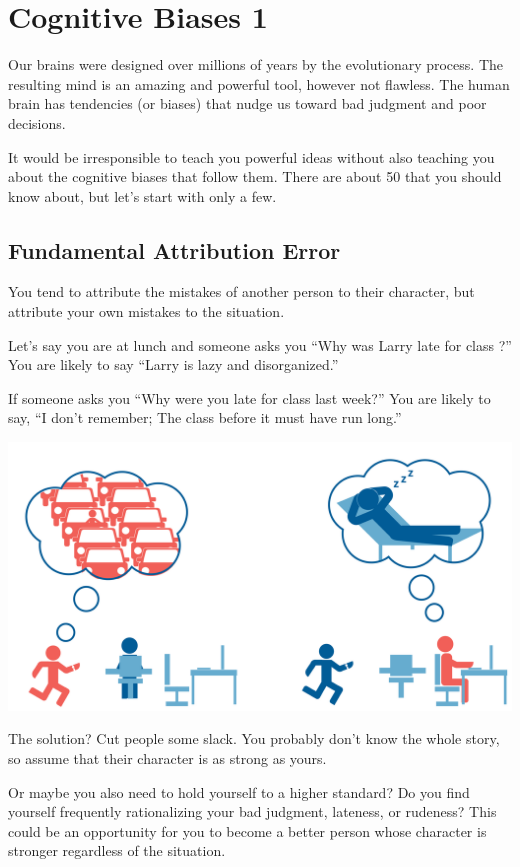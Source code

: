 \chapter{Cognitive Biases 1}


Our brains were designed over millions of years by the evolutionary
process. The resulting mind is an amazing and powerful tool, however
not flawless. The human brain has tendencies (or biases) that nudge us
toward bad judgment and poor decisions.

It would be irresponsible to teach you powerful ideas without
also teaching you about the cognitive biases that follow them. There are about 50
that you should know about, but let's start with only a few.

\section{Fundamental Attribution Error}

You tend to attribute
the mistakes of another person to their character, but attribute your
own mistakes to the situation.

Let's say you are at lunch and someone asks you ``Why was Larry late
for class ?''  You are likely to say ``Larry is lazy
and disorganized.''

If someone asks you ``Why were you late for class last week?''  You
are likely to say, ``I don't remember; The class before it must have
run long.''

\includegraphics[width=1\textwidth]{fundamentalAttributionError.png}

The solution? Cut people some slack. You probably don't know the whole
story, so assume that their character is as strong as yours.

Or maybe you also need to hold yourself to a higher standard? Do you find
yourself frequently rationalizing your bad judgment, lateness, or
rudeness?  This could be an opportunity for you to become a better
person whose character is stronger regardless of the situation.

